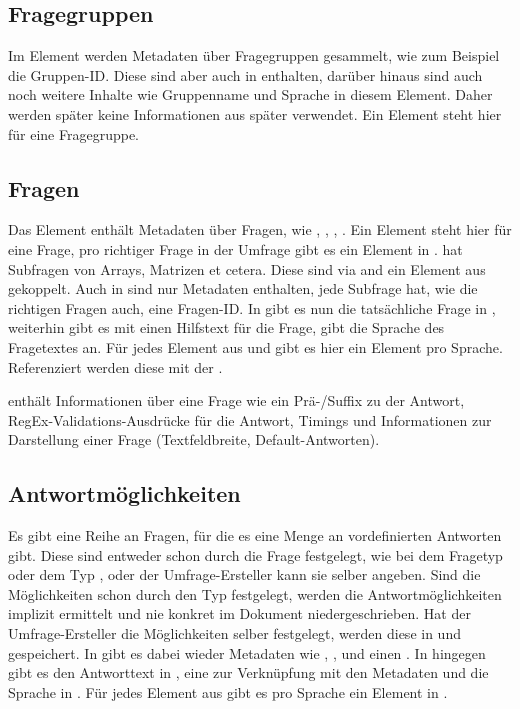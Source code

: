 \subsection{Fragegruppen}

Im Element  werden Metadaten über Fragegruppen gesammelt, wie zum Beispiel die Gruppen-ID.
Diese sind aber auch in  enthalten, darüber hinaus sind auch noch weitere Inhalte wie Gruppenname und Sprache in diesem Element.
Daher werden später keine Informationen aus  später verwendet.
Ein  Element steht hier für eine Fragegruppe.

\subsection{Fragen}

Das Element  enthält Metadaten über Fragen, wie , , , .
Ein  Element steht hier für eine Frage, pro richtiger Frage in der Umfrage gibt es ein Element in .
 hat Subfragen von Arrays, Matrizen et cetera. Diese sind via  and ein Element aus  gekoppelt.
Auch in  sind nur Metadaten enthalten, jede Subfrage hat, wie die richtigen Fragen auch, eine Fragen-ID.
In  gibt es nun die tatsächliche Frage in , weiterhin gibt es mit  einen Hilfstext für die Frage,  gibt die Sprache des Fragetextes an.
Für jedes Element aus  und  gibt es hier ein Element pro Sprache.
Referenziert werden diese mit der .

 enthält Informationen über eine Frage wie ein Prä-/Suffix zu der Antwort, RegEx-Validations-Ausdrücke für die Antwort, Timings und Informationen zur Darstellung einer Frage (Textfeldbreite, Default-Antworten).

\subsection{Antwortmöglichkeiten}

Es gibt eine Reihe an Fragen, für die es eine Menge an vordefinierten Antworten gibt.
Diese sind entweder schon durch die Frage festgelegt, wie bei dem Fragetyp  oder dem Typ , oder der Umfrage-Ersteller kann sie selber angeben.
Sind die Möglichkeiten schon durch den Typ festgelegt, werden die Antwortmöglichkeiten implizit ermittelt und nie konkret im Dokument niedergeschrieben.
Hat der Umfrage-Ersteller die Möglichkeiten selber festgelegt, werden diese in  und  gespeichert.
In  gibt es dabei wieder Metadaten wie , , und einen .
In  hingegen gibt es den Antworttext in , eine  zur Verknüpfung mit den Metadaten und die Sprache in .
Für jedes Element aus  gibt es pro Sprache ein Element in .

